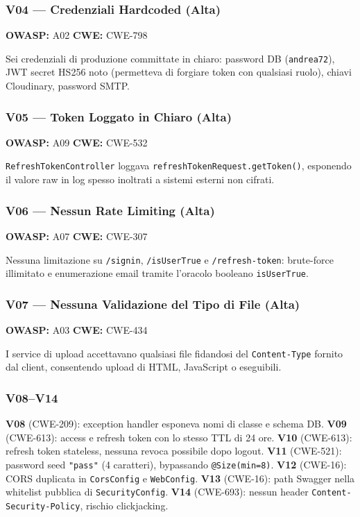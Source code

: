 \documentclass[12pt, a4paper]{article}
\begin{document}
    \subsubsection{V04 --- Credenziali Hardcoded (Alta)}
    \textbf{OWASP:} A02 \textbar{} \textbf{CWE:} CWE-798

    Sei credenziali di produzione committate in chiaro: password DB (\texttt{andrea72}),
    JWT secret HS256 noto (permetteva di forgiare token con qualsiasi ruolo),
    chiavi Cloudinary, password SMTP.

    \subsubsection{V05 --- Token Loggato in Chiaro (Alta)}
    \textbf{OWASP:} A09 \textbar{} \textbf{CWE:} CWE-532

    \texttt{RefreshTokenController} loggava \texttt{refreshTokenRequest.getToken()},
    esponendo il valore raw in log spesso inoltrati a sistemi esterni non cifrati.

    \subsubsection{V06 --- Nessun Rate Limiting (Alta)}
    \textbf{OWASP:} A07 \textbar{} \textbf{CWE:} CWE-307

    Nessuna limitazione su \texttt{/signin}, \texttt{/isUserTrue} e \texttt{/refresh-token}:
    brute-force illimitato e enumerazione email tramite l'oracolo booleano \texttt{isUserTrue}.

    \subsubsection{V07 --- Nessuna Validazione del Tipo di File (Alta)}
    \textbf{OWASP:} A03 \textbar{} \textbf{CWE:} CWE-434

    I service di upload accettavano qualsiasi file fidandosi del \texttt{Content-Type}
    fornito dal client, consentendo upload di HTML, JavaScript o eseguibili.

    \subsubsection{V08--V14}
    \textbf{V08} (CWE-209): exception handler esponeva nomi di classe e schema DB.
    \textbf{V09} (CWE-613): access e refresh token con lo stesso TTL di 24 ore.
    \textbf{V10} (CWE-613): refresh token stateless, nessuna revoca possibile dopo logout.
    \textbf{V11} (CWE-521): password seed \texttt{"pass"} (4 caratteri), bypassando \texttt{@Size(min=8)}.
    \textbf{V12} (CWE-16): CORS duplicata in \texttt{CorsConfig} e \texttt{WebConfig}.
    \textbf{V13} (CWE-16): path Swagger nella whitelist pubblica di \texttt{SecurityConfig}.
    \textbf{V14} (CWE-693): nessun header \texttt{Content-Security-Policy}, rischio clickjacking.
\end{document}
